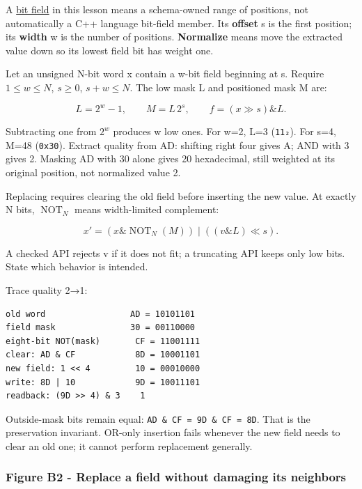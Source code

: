 \hypertarget{01-foundations-i-ch001-fields-select-normalize-replace}{}

A \hyperref[appendix-ac697f5c66e8]{bit field} in this lesson means a schema-owned range of positions, not automatically a C++ language bit-field member. Its \textbf{offset} s is the first position; its \textbf{width} w is the number of positions. \textbf{Normalize} means move the extracted value down so its lowest field bit has weight one.

Let an unsigned N-bit word x contain a w-bit field beginning at s. Require \(1\le w\le N\), \(s\ge0\), \(s+w\le N\). The low mask L and positioned mask M are:

\[
L=2^w-1,\qquad M=L\,2^s,\qquad f=(x\gg s)\mathbin{\&}L.
\]

Subtracting one from \(2^w\) produces w low ones. For w=2, L=3 (\texttt{11₂}). For s=4, M=48 (\texttt{0x30}). Extract quality from AD: shifting right four gives A; AND with 3 gives 2. Masking AD with 30 alone gives 20 hexadecimal, still weighted at its original position, not normalized value 2.

Replacing requires clearing the old field before inserting the new value. At exactly N bits, \(\operatorname{NOT}_N\) means width-limited complement:

\[
x'=(x\mathbin{\&}\operatorname{NOT}_N(M))
\mathbin{|}((v\mathbin{\&}L)\ll s).
\]

A checked API rejects v if it does not fit; a truncating API keeps only low bits. State which behavior is intended.

Trace quality 2→1:

\begin{verbatim}
old word                 AD = 10101101
field mask               30 = 00110000
eight-bit NOT(mask)       CF = 11001111
clear: AD & CF            8D = 10001101
new field: 1 << 4         10 = 00010000
write: 8D | 10            9D = 10011101
readback: (9D >> 4) & 3    1
\end{verbatim}

Outside-mask bits remain equal: \texttt{AD\ \&\ CF\ =\ 9D\ \&\ CF\ =\ 8D}. That is the preservation invariant. OR-only insertion fails whenever the new field needs to clear an old one; it cannot perform replacement generally.

\subsubsection{Figure B2 - Replace a field without damaging its neighbors}\label{01-foundations-i-ch001-figure-b2---replace-a-field-without-damaging-its-neighbors}

